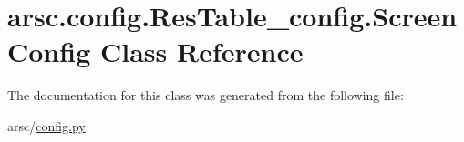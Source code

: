 \hypertarget{classarsc_1_1config_1_1ResTable__config_1_1ScreenConfig}{}\section{arsc.\+config.\+Res\+Table\+\_\+config.\+Screen\+Config Class Reference}
\label{classarsc_1_1config_1_1ResTable__config_1_1ScreenConfig}


The documentation for this class was generated from the following file\+:\begin{DoxyCompactItemize}
\item 
arsc/\mbox{\hyperlink{config_8py}{config.\+py}}\end{DoxyCompactItemize}
